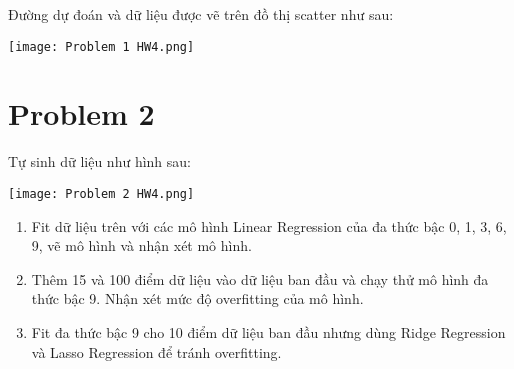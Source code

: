 \documentclass[a4paper, 12pt]{article}  %
\begin{document}
Đường dự đoán và dữ liệu được vẽ trên đồ thị scatter như sau:
\begin{center}
    \texttt{[image: Problem 1 HW4.png]}
\end{center}
    
    
\section{Problem 2}

Tự sinh dữ liệu như hình sau:
\begin{center}
    \texttt{[image: Problem 2 HW4.png]}
\end{center}

\begin{enumerate}[label=\alph*.]
    \item Fit dữ liệu trên với các mô hình Linear Regression của đa thức bậc 0, 1, 3, 6, 9, vẽ mô hình và nhận xét mô hình.
    \item Thêm 15 và 100 điểm dữ liệu vào dữ liệu ban đầu và chạy thử mô hình đa thức bậc 9. Nhận xét mức độ overfitting của mô hình.
    \item Fit đa thức bậc 9 cho 10 điểm dữ liệu ban đầu nhưng dùng Ridge Regression và Lasso Regression để tránh overfitting.
\end{enumerate}
\end{document}
